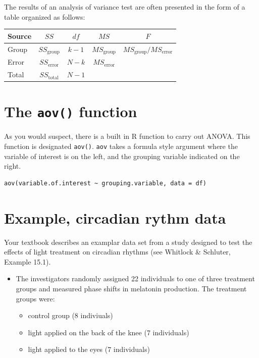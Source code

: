 \documentclass[]{book}
\providecommand{\tightlist}{%
  \setlength{\itemsep}{0pt}\setlength{\parskip}{0pt}}
\theoremstyle{definition}
\theoremstyle{definition}
\theoremstyle{definition}
\theoremstyle{remark}
\begin{document}
The results of an analysis of variance test are often presented in the
form of a table organized as follows:

\begin{longtable}[]{@{}lcccc@{}}
\toprule
Source & \(SS\) & \(df\) & \(MS\) & \(F\)\tabularnewline
\midrule
\endhead
Group & \(SS_\text{group}\) & \(k-1\) & \(MS_\text{group}\) &
\(MS_\text{group}/MS_\text{error}\)\tabularnewline
Error & \(SS_\text{error}\) & \(N-k\) & \(MS_\text{error}\)
&\tabularnewline
Total & \(SS_\text{total}\) & \(N-1\) & &\tabularnewline
\bottomrule
\end{longtable}

\hypertarget{the-aov-function}{%
\section{\texorpdfstring{The \texttt{aov()}
function}{The aov() function}}\label{the-aov-function}}

As you would suspect, there is a built in R function to carry out ANOVA.
This function is designated \texttt{aov()}. \texttt{aov} takes a formula
style argument where the variable of interest is on the left, and the
grouping variable indicated on the right.

\begin{verbatim}
aov(variable.of.interest ~ grouping.variable, data = df)
\end{verbatim}

\hypertarget{example-circadian-rythm-data}{%
\section{Example, circadian rythm
data}\label{example-circadian-rythm-data}}

Your textbook describes an examplar data set from a study designed to
test the effects of light treatment on circadian rhythms (see Whitlock
\& Schluter, Example 15.1).

\begin{itemize}
\tightlist
\item
  The investigators randomly assigned 22 individuals to one of three
  treatment groups and measured phase shifts in melatonin production.
  The treatment groups were:

  \begin{itemize}
  \tightlist
  \item
    control group (8 indiviuals)
  \item
    light applied on the back of the knee (7 individuals)
  \item
    light applied to the eyes (7 individuals)
  \end{itemize}
\end{itemize}
\end{document}
